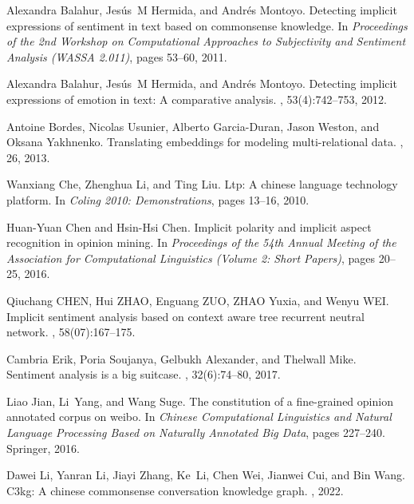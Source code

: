 \documentclass[11pt]{article}
\begin{document}
\begin{thebibliography}{10}

Alexandra Balahur, Jes{\'u}s~M Hermida, and Andr{\'e}s Montoyo.
\newblock Detecting implicit expressions of sentiment in text based on
  commonsense knowledge.
\newblock In {\em Proceedings of the 2nd Workshop on Computational Approaches
  to Subjectivity and Sentiment Analysis (WASSA 2.011)}, pages 53--60, 2011.

Alexandra Balahur, Jes{\'u}s~M Hermida, and Andr{\'e}s Montoyo.
\newblock Detecting implicit expressions of emotion in text: A comparative
  analysis.
, 53(4):742--753, 2012.

Antoine Bordes, Nicolas Usunier, Alberto Garcia-Duran, Jason Weston, and Oksana
  Yakhnenko.
\newblock Translating embeddings for modeling multi-relational data.
, 26, 2013.

Wanxiang Che, Zhenghua Li, and Ting Liu.
\newblock Ltp: A chinese language technology platform.
\newblock In {\em Coling 2010: Demonstrations}, pages 13--16, 2010.

Huan-Yuan Chen and Hsin-Hsi Chen.
\newblock Implicit polarity and implicit aspect recognition in opinion mining.
\newblock In {\em Proceedings of the 54th Annual Meeting of the Association for
  Computational Linguistics (Volume 2: Short Papers)}, pages 20--25, 2016.

Qiuchang CHEN, Hui ZHAO, Enguang ZUO, ZHAO Yuxia, and Wenyu WEI.
\newblock Implicit sentiment analysis based on context aware tree recurrent
  neutral network.
, 58(07):167--175.

Cambria Erik, Poria Soujanya, Gelbukh Alexander, and Thelwall Mike.
\newblock Sentiment analysis is a big suitcase.
, 32(6):74--80, 2017.

Liao Jian, Li~Yang, and Wang Suge.
\newblock The constitution of a fine-grained opinion annotated corpus on weibo.
\newblock In {\em Chinese Computational Linguistics and Natural Language
  Processing Based on Naturally Annotated Big Data}, pages 227--240. Springer,
  2016.

Dawei Li, Yanran Li, Jiayi Zhang, Ke~Li, Chen Wei, Jianwei Cui, and Bin Wang.
\newblock C3kg: A chinese commonsense conversation knowledge graph.
, 2022.


\end{thebibliography}
\end{document}
